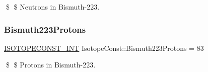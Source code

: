 \$ \$ Neutrons in Bismuth-\/223. \mbox{\label{group___isotope_const-_bismuth-_bi223_gaff62f7a68b9e5bb9c53e6fb007c3d920}} 
\subsubsection{\texorpdfstring{Bismuth223\+Protons}{Bismuth223Protons}}
{\footnotesize\ttfamily \mbox{\hyperlink{group___isotope_const-_macros_ga5f18360b3e99483a35c32d789e62621c}{I\+S\+O\+T\+O\+P\+E\+C\+O\+N\+S\+T\+\_\+\+I\+NT}} Isotope\+Const\+::\+Bismuth223\+Protons = 83}

\$ \$ Protons in Bismuth-\/223. 